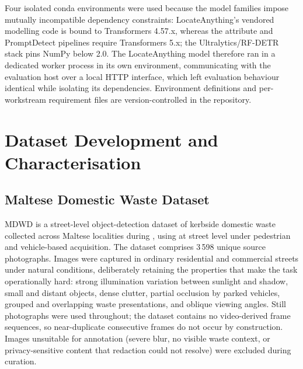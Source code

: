 Four isolated conda environments were used because the model families impose mutually incompatible dependency constraints: LocateAnything's vendored modelling code is bound to Transformers 4.57.x, whereas the attribute and PromptDetect pipelines require Transformers 5.x; the Ultralytics/RF-DETR stack pins NumPy below 2.0. The LocateAnything model therefore ran in a dedicated worker process in its own environment, communicating with the evaluation host over a local HTTP interface, which left evaluation behaviour identical while isolating its dependencies. Environment definitions and per-workstream requirement files are version-controlled in the repository.

\section{Dataset Development and Characterisation}
\label{sec:dataset-development}

\subsection{Maltese Domestic Waste Dataset}
\label{subsec:mdwd-methodology}

MDWD is a street-level object-detection dataset of kerbside domestic waste collected across Maltese localities during , using  at street level under pedestrian and vehicle-based acquisition. The dataset comprises 3\,598 unique source photographs. Images were captured in ordinary residential and commercial streets under natural conditions, deliberately retaining the properties that make the task operationally hard: strong illumination variation between sunlight and shadow, small and distant objects, dense clutter, partial occlusion by parked vehicles, grouped and overlapping waste presentations, and oblique viewing angles. Still photographs were used throughout; the dataset contains no video-derived frame sequences, so near-duplicate consecutive frames do not occur by construction. Images unsuitable for annotation (severe blur, no visible waste context, or privacy-sensitive content that redaction could not resolve) were excluded during curation.

